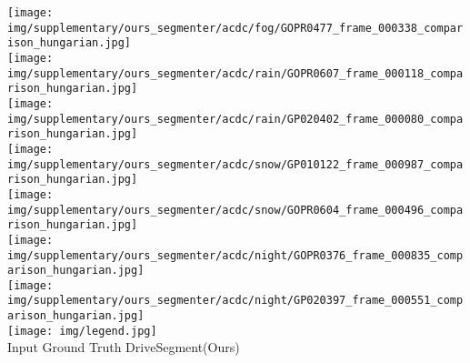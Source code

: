 \documentclass[runningheads]{llncs}
\newcommand{\ours}{DriveSegment\xspace}
\begin{document}
\begin{figure*}[t!]
    \texttt{[image: img/supplementary/ours\_segmenter/acdc/fog/GOPR0477\_frame\_000338\_comparison\_hungarian.jpg]} \\
    \texttt{[image: img/supplementary/ours\_segmenter/acdc/rain/GOPR0607\_frame\_000118\_comparison\_hungarian.jpg]} \\
    \texttt{[image: img/supplementary/ours\_segmenter/acdc/rain/GP020402\_frame\_000080\_comparison\_hungarian.jpg]} \\
    \texttt{[image: img/supplementary/ours\_segmenter/acdc/snow/GP010122\_frame\_000987\_comparison\_hungarian.jpg]} \\
    \texttt{[image: img/supplementary/ours\_segmenter/acdc/snow/GOPR0604\_frame\_000496\_comparison\_hungarian.jpg]} \\
    \texttt{[image: img/supplementary/ours\_segmenter/acdc/night/GOPR0376\_frame\_000835\_comparison\_hungarian.jpg]} \\
    \texttt{[image: img/supplementary/ours\_segmenter/acdc/night/GP020397\_frame\_000551\_comparison\_hungarian.jpg]} \\
    \texttt{[image: img/legend.jpg]} \\
    {\small \hspace*{1.7cm} Input \hspace{2.2cm} Ground Truth \hspace{1.5cm} \ours (Ours)}
\vspace*{-8pt}
\caption{\textbf{Waymo Open Dataset \emph{day}  ACDC~\cite{SDV21} \{\emph{fog, rain, snow, night}\}.} Qualitative results of our \ours model trained on the daytime images from the Waymo Open Dataset and used to segment samples from the ACDC~\cite{SDV21} dataset with various adverse conditions. 
In rows 2-5 the \emph{ground} is incorrectly segmented as \emph{sky}. This failure mode is further discussed in Section~\ref{sec:failure_cases}. }
\label{fig:qualitative_acdc}
\vspace{-1ex}
\end{figure*}

 
\end{document}
